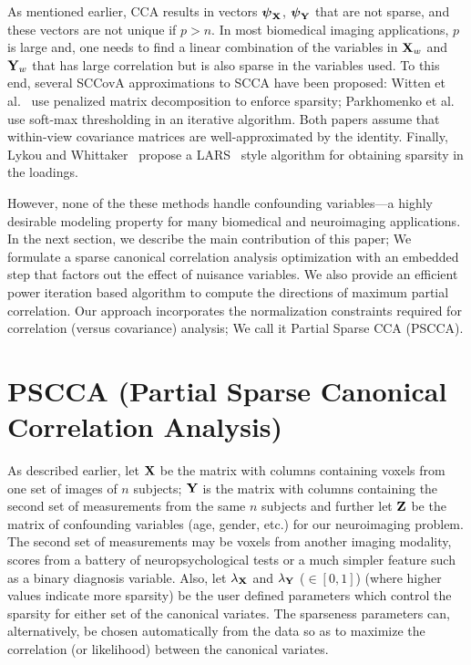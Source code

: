 \documentclass{llncs}
\newcommand{\X}{{\bf X}}
\newcommand{\Y}{{\bf Y}}
\newcommand{\Z}{{\bf Z}}
\newcommand{\bs}{\boldsymbol}
\begin{document}
As mentioned earlier, CCA results in vectors $\bs\psi_{\X}$,
$\bs\psi_{\Y}$ that are not sparse, and these vectors are not unique
if $p > n$. In most biomedical imaging applications, $p$ is
large and, one needs to find a linear combination of the
variables in $\X_w$ and $\Y_w$ that has large correlation but is also
sparse in the variables used. To this end, several SCCovA
approximations to SCCA have been proposed: Witten et al.~\cite{witten} use
penalized matrix decomposition to enforce sparsity; Parkhomenko et al.~\cite{parkhomenko}
use soft-max thresholding in an iterative algorithm.  Both papers assume that
within-view covariance matrices are well-approximated by the
identity.  Finally, Lykou and Whittaker~\cite{lykou} propose a LARS~\cite{lars} style algorithm for 
obtaining sparsity in the loadings. 

However, none of the these methods handle confounding variables---a
highly desirable modeling property for many biomedical and
neuroimaging applications.  In the next section, we describe the main
contribution of this paper;  We formulate a sparse canonical
correlation analysis optimization with an embedded step that factors
out the effect of nuisance variables.  We also provide an efficient
power iteration based algorithm to compute the directions of maximum
partial correlation. Our approach incorporates the normalization
constraints required for correlation (versus covariance) analysis; 
We call it Partial Sparse CCA (PSCCA).

\section{PSCCA (Partial Sparse Canonical Correlation Analysis)}
As described earlier, let $\X$ be the matrix with columns containing voxels from one set of
images of $n$ subjects; $\Y$ is the matrix with columns containing
the second set of measurements from the same $n$ subjects and further
let $\Z$ be the matrix of confounding variables (age, gender, etc.) for
our neuroimaging problem.  The second set of measurements may be
voxels from another imaging modality, scores from a battery of
neuropsychological tests or a much simpler feature such as a binary
diagnosis variable.  Also, let $\lambda_{\X}$ and $\lambda_{\Y}$ ($\in
[0,1]$) (where higher values indicate more sparsity) be the user defined 
parameters which control the sparsity for either set of the canonical
variates.  The sparseness parameters can, alternatively, be chosen automatically 
from the data so as to maximize the correlation (or likelihood) between the canonical variates.
\end{document}

